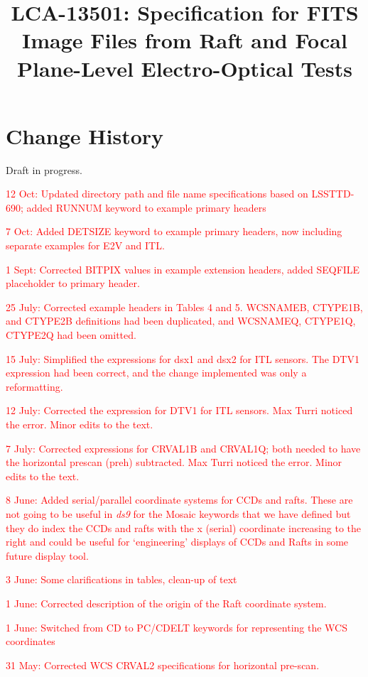 \documentclass{article}[12pt]
\title{LCA-13501:  Specification for FITS Image Files from Raft and Focal Plane-Level Electro-Optical Tests}
\newcommand{\red}{\textcolor{red}}
\begin{document}
\maketitle
\tableofcontents
\newpage
\listoftables

\section{Change History}
Draft in progress. %

\red{12 Oct:  Updated directory path and file name specifications based on LSSTTD-690; added RUNNUM keyword to example primary headers}

\red{7 Oct:  Added DETSIZE keyword to example primary headers, now including separate examples for E2V and ITL.}

\red{1 Sept: Corrected BITPIX values in example extension headers, added SEQFILE placeholder to primary header.}

\red{25 July: Corrected example headers in Tables 4 and 5.  WCSNAMEB, CTYPE1B, and CTYPE2B definitions had been duplicated, and WCSNAMEQ, CTYPE1Q, CTYPE2Q had been omitted.}

\red{15 July: Simplified the expressions for dsx1 and dsx2 for ITL sensors.  The DTV1 expression had been correct, and the change implemented was only a reformatting.}
  
\red{12 July:  Corrected the expression for DTV1 for ITL sensors.  Max Turri noticed the error.  Minor edits to the text.}

\red{7 July:  Corrected expressions for CRVAL1B and CRVAL1Q; both needed to have the horizontal prescan (preh) subtracted.  Max Turri noticed the error.  Minor edits to the text.}

\red{8 June:  Added serial/parallel coordinate systems for CCDs and rafts.  These are not going to be useful in {\it ds9} for the Mosaic keywords that we have defined but they do index the CCDs and rafts with the x (serial) coordinate increasing to the right and could be useful for `engineering' displays of CCDs and Rafts in some future display tool.}  
 
\red{3 June:  Some clarifications in tables, clean-up of text}

\red{1 June:  Corrected description of the origin of the Raft coordinate system.}

\red{1 June:  Switched from CD to PC/CDELT keywords for representing the WCS coordinates} 

\red{31 May:  Corrected WCS CRVAL2 specifications for horizontal pre-scan.}
\end{document}
